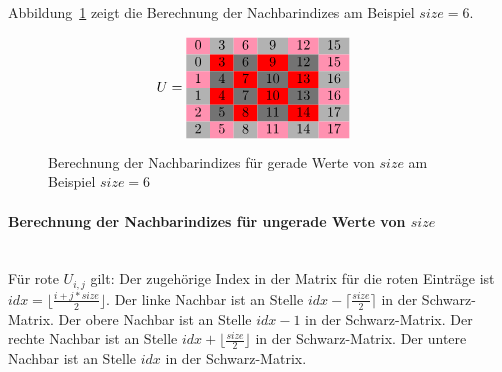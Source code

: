 \documentclass{article}
\begin{document}
Abbildung~\ref{fig:matrix:even} zeigt die Berechnung der Nachbarindizes am Beispiel $size=6$.

\begin{figure}[h!]
\centering
$$U = 
\begin{tabular}{cccccc}
  \cellcolor{rose}0 & \cellcolor[gray]{0.7}3 & \cellcolor{rose}6 & \cellcolor[gray]{0.7}9 & \cellcolor{rose}12 & \cellcolor[gray]{0.7}15\\
  
 \cellcolor[gray]{0.7}0 & \cellcolor{red}3 & \cellcolor[gray]{0.45}6 & \cellcolor{red}9 & \cellcolor[gray]{0.45}12 & \cellcolor{rose}15\\
 
  \cellcolor{rose}1 & \cellcolor[gray]{0.45}4 & \cellcolor{red}7 & \cellcolor[gray]{0.45}10 & \cellcolor{red}13 & \cellcolor[gray]{0.7}16\\
  
 \cellcolor[gray]{0.7}1 & \cellcolor{red}4 & \cellcolor[gray]{0.45}7 & \cellcolor{red}10 & \cellcolor[gray]{0.45}13 & \cellcolor{rose}16 \\
 
 \cellcolor{rose}2 & \cellcolor[gray]{0.45}5 & \cellcolor{red}8 & \cellcolor[gray]{0.45}11 & \cellcolor{red}14 & \cellcolor[gray]{0.7}17\\
 
 \cellcolor[gray]{0.7}2 & \cellcolor{rose}5 & \cellcolor[gray]{0.7}8 & \cellcolor{rose}11 & \cellcolor[gray]{0.7}14 & \cellcolor{rose}17\\
\end{tabular} \quad
$$
\caption{Berechnung der Nachbarindizes für gerade Werte von $size$ am Beispiel $size=6$}
\label{fig:matrix:even}
\end{figure}

\paragraph{Berechnung der Nachbarindizes für ungerade Werte von $size$}~\\
Für rote $U_{i,j}$ gilt: Der zugehörige Index in der Matrix für die roten Einträge ist $idx = \lfloor\frac{i+j*size}{2}\rfloor$. Der linke Nachbar ist an Stelle $idx - \lceil\frac{size}{2}\rceil$ in der Schwarz-Matrix. Der obere Nachbar ist an Stelle $idx - 1$ in der Schwarz-Matrix. Der rechte Nachbar ist an Stelle $idx + \lfloor\frac{size}{2}\rfloor$ in der Schwarz-Matrix. Der untere Nachbar ist an Stelle $idx$ in der Schwarz-Matrix.
\end{document}
